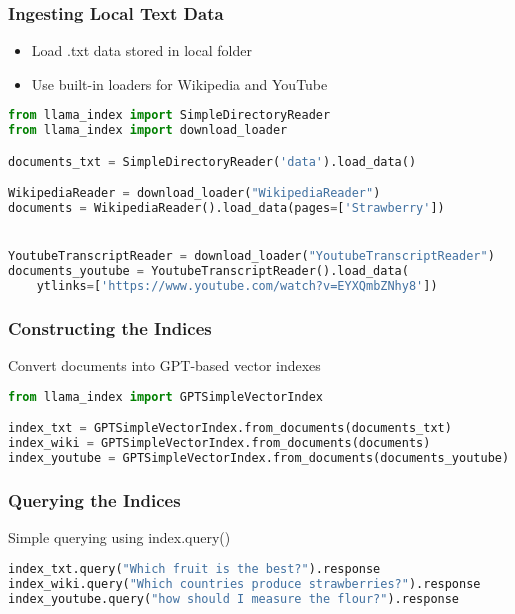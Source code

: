 \begin{frame}[fragile]\frametitle{Ingesting Local Text Data}

    \begin{itemize}
		\item Load .txt data stored in local folder
        \item Use built-in loaders for Wikipedia and YouTube
    \end{itemize}
	
\begin{lstlisting}[language=Python]
from llama_index import SimpleDirectoryReader
from llama_index import download_loader

documents_txt = SimpleDirectoryReader('data').load_data()

WikipediaReader = download_loader("WikipediaReader")
documents = WikipediaReader().load_data(pages=['Strawberry'])


YoutubeTranscriptReader = download_loader("YoutubeTranscriptReader")
documents_youtube = YoutubeTranscriptReader().load_data(
    ytlinks=['https://www.youtube.com/watch?v=EYXQmbZNhy8'])
\end{lstlisting}
\end{frame}

\begin{frame}[fragile]\frametitle{Constructing the Indices}
 Convert documents into GPT-based vector indexes
\begin{lstlisting}[language=Python]
from llama_index import GPTSimpleVectorIndex

index_txt = GPTSimpleVectorIndex.from_documents(documents_txt)
index_wiki = GPTSimpleVectorIndex.from_documents(documents)
index_youtube = GPTSimpleVectorIndex.from_documents(documents_youtube)
\end{lstlisting}
\end{frame}

\begin{frame}[fragile]\frametitle{Querying the Indices}
Simple querying using index.query()

\begin{lstlisting}[language=Python]
index_txt.query("Which fruit is the best?").response
index_wiki.query("Which countries produce strawberries?").response
index_youtube.query("how should I measure the flour?").response
\end{lstlisting}
\end{frame}

